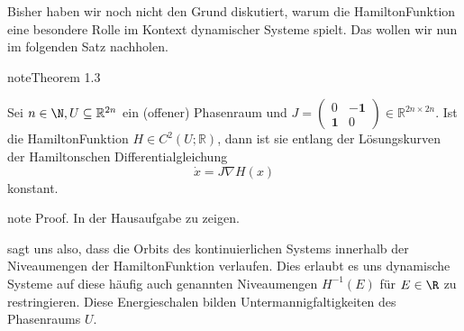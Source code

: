 \documentclass[letterpaper,10pt,german]{jupyterBook}
\begin{document}
\sphinxAtStartPar
Bisher haben wir noch nicht den Grund diskutiert, warum die Hamilton\sphinxhyphen{}Funktion eine besondere Rolle im Kontext dynamischer Systeme spielt.
Das wollen wir nun im folgenden Satz nachholen.
\label{ode/hamilton:thm:hamconst}
\begin{sphinxadmonition}{note}{Theorem 1.3}



\sphinxAtStartPar
Sei \(n\in \N, U \subseteq \mathbb{R}^{2n}\) ein (offener) Phasenraum und \(J= \begin{pmatrix} 0 & - \mathbf{1} \\ \mathbf{1} & 0 \end{pmatrix} \in \mathbb{R}^{2n \times 2n}\).
Ist die Hamilton\sphinxhyphen{}Funktion \(H \in C^2(U; \mathbb{R})\), dann ist sie entlang der Lösungskurven der Hamiltonschen Differentialgleichung
\begin{equation*}
\dot x = J \nabla H(x)
\end{equation*}
\sphinxAtStartPar
konstant.
\end{sphinxadmonition}

\begin{sphinxadmonition}{note}
\sphinxAtStartPar
Proof. In der Hausaufgabe zu zeigen.
\end{sphinxadmonition}

\sphinxAtStartPar
{\hyperref[\detokenize{ode/hamilton:thm:hamconst}]{}} sagt uns also, dass die Orbits des kontinuierlichen Systems innerhalb der Niveaumengen der Hamilton\sphinxhyphen{}Funktion verlaufen.
Dies erlaubt es uns dynamische Systeme auf diese häufig auch  genannten Niveaumengen \(H^{-1}(E)\) für \(E \in \R\) zu restringieren.
Diese Energieschalen bilden Untermannigfaltigkeiten des Phasenraums \(U\).
\end{document}
